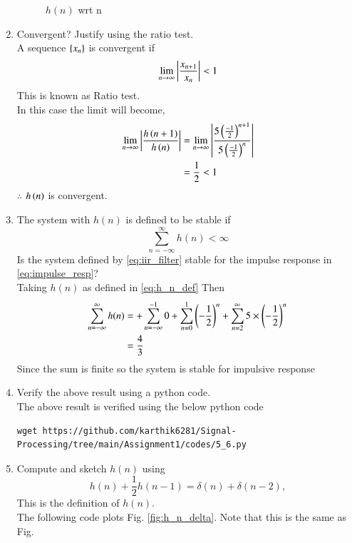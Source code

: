 \documentclass[journal,12pt,twocolumn]{IEEEtran}
\renewcommand\thesection{\arabic{section}}
\begin{document}
\begin{enumerate}[label=\thesection.\arabic*]
\begin{figure}[!ht]
		\caption{$h(n)$ wrt n}
		\label{fig:5.2}
	\end{figure}
     \item Convergent? Justify using the ratio test.\\
\solution  A  sequence $\left\{x_n\right\}$ is convergent if 
\begin{align}
	\lim_{n \rightarrow \infty}\left\vert\frac{x_{n+1}}{x_n}\right\vert < 1
\end{align}
This is known as Ratio test.\\
In this case the limit will become,
\begin{align}
	\lim_{n \rightarrow \infty}\left\vert\frac{h\left(n+1\right)}{h\left(n\right)}\right\vert &= \lim_{n \rightarrow \infty}\left\vert\frac{5\left(\frac{-1}{2}\right)^{n+1}}{5\left(\frac{-1}{2}\right)^{n}}\right\vert \\
	&= \frac{1}{2} < 1
\end{align}
$\therefore$ $h\left(n\right)$ is convergent.
	\item The system with $h(n)$ is defined to be stable if
	\begin{equation}
		\sum_{n=-\infty}^{\infty}h(n) < \infty
	\end{equation}
	Is the system defined by \eqref{eq:iir_filter} stable for the impulse response in \eqref{eq:impulse_resp}?\\
	\solution Taking $h(n)$ as defined in \eqref{eq:h_n_def} 
	Then
	\begin{align}
		\sum_{n=-\infty}^{\infty}h(n)&= +\sum_{n=-\infty}^{-1}0+\sum_{n=0}^{1} \left(-\frac{1}{2}\right)^n+\sum_{n=2}^{\infty}5\times \left(-\frac{1}{2}\right)^n\\
		&=\frac{4}{3}
	\end{align}
	Since the sum is finite so the system is stable for impulsive response
	\item Verify the above result using a python code.\\
	\solution The above result is verified using the below python code
		\begin{lstlisting}
wget https://github.com/karthik6281/Signal-Processing/tree/main/Assignment1/codes/5_6.py
	\end{lstlisting}
	\item 
	Compute and sketch $h(n)$ using 
	\begin{equation}
		\label{eq:iir_filter_h}
		h(n) + \frac{1}{2}h(n-1) = \delta(n) + \delta(n-2), 
	\end{equation}
	This is the definition of $h(n)$.
	\\
	\solution The following code plots Fig. \ref{fig:h_n_delta}. Note that this is the same as Fig. 

\end{enumerate}
\end{document}
